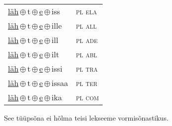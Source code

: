 \begin{minipage}{\textwidth}
\begin{sideways}
\begin{tabular}{l l}
\underline{läh}\,$\oplus$\,t\,$\oplus$\,\underline{e}\,$\oplus$\,iss & \textsc{ pl ela } \\
\underline{läh}\,$\oplus$\,t\,$\oplus$\,\underline{e}\,$\oplus$\,ille & \textsc{ pl all } \\
\underline{läh}\,$\oplus$\,t\,$\oplus$\,\underline{e}\,$\oplus$\,ill & \textsc{ pl ade } \\
\underline{läh}\,$\oplus$\,t\,$\oplus$\,\underline{e}\,$\oplus$\,ilt & \textsc{ pl abl } \\
\underline{läh}\,$\oplus$\,t\,$\oplus$\,\underline{e}\,$\oplus$\,issi & \textsc{ pl tra } \\
\underline{läh}\,$\oplus$\,t\,$\oplus$\,\underline{e}\,$\oplus$\,issaa & \textsc{ pl ter } \\
\underline{läh}\,$\oplus$\,t\,$\oplus$\,\underline{e}\,$\oplus$\,ika & \textsc{ pl com } \\
\end{tabular}
\end{sideways}
\label{tab:tüüpsõnamall-lähe}

\end{minipage}

 
\vspace{1em}
\noindent See tüüpsõna ei hõlma teisi lekseeme vormi\-sõnastikus.
